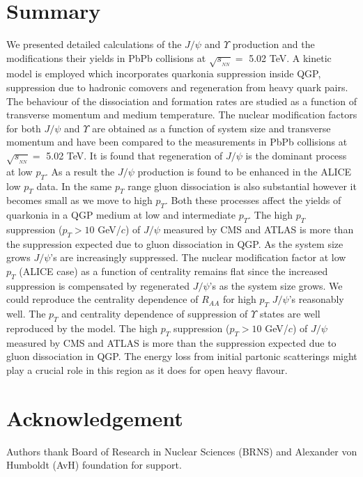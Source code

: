 \documentclass[12pt,a4paper,final]{iopart} %
\newcommand{\Jpsi}{J/\psi}
\newcommand{\pT}{p_{T}}
\newcommand{\sNN}{\sqrt{s_{_{NN}}}}
\begin{document}
\section{Summary}
 We presented detailed calculations of the $\Jpsi$ and $\Upsilon$ 
production and the modifications their yields in PbPb collisions at $\sNN =$ 5.02 TeV.
A kinetic model is employed which incorporates quarkonia suppression inside QGP, suppression 
due to hadronic comovers and regeneration from heavy quark pairs.
The behaviour of the dissociation and formation rates are studied as a function of
transverse momentum and medium temperature. 
The nuclear modification factors for both $\Jpsi$ and $\Upsilon$ are obtained 
as a function of system size and transverse momentum and have been compared to the measurements
in PbPb collisions at $\sNN =$ 5.02 TeV.
It is found that  regeneration of $\Jpsi$ is the dominant process at low $p_T$. As a result the $\Jpsi$ production 
is found to be enhanced in the ALICE low $p_T$ data.
In the same $p_T$ range gluon dissociation is also substantial however it becomes small
as we move to high $p_T$. 
 Both  these processes affect the 
yields of quarkonia in a QGP medium  at low and intermediate $p_T$. The high $p_T$ 
suppression ($p_T > 10$  GeV/$c$) of $\Jpsi$ measured by CMS and ATLAS is more than
the suppression expected due to gluon dissociation in QGP.
As the system size grows  $\Jpsi$'s are increasingly suppressed.  The nuclear 
modification factor at low $p_T$  (ALICE case) as a function of centrality remains
flat since the increased suppression is compensated by regenerated  $\Jpsi$'s
as the system size grows. 
We could reproduce the centrality dependence of $R_{AA}$ for high $p_T$ $\Jpsi$'s reasonably
well. The $\pT$ and centrality dependence of suppression of $\Upsilon$ states are well reproduced
by the model. The high $\pT$ suppression ($p_T > 10$  GeV/$c$) of $\Jpsi$ measured by CMS and
ATLAS is more than the suppression expected due to gluon dissociation in QGP.
The energy loss from initial partonic scatterings might play a crucial role in this region
as it does for open heavy flavour.


\section{Acknowledgement}
Authors thank Board of Research in Nuclear Sciences (BRNS) and Alexander von Humboldt (AvH)
foundation for support. 

%
%
\end{document}
